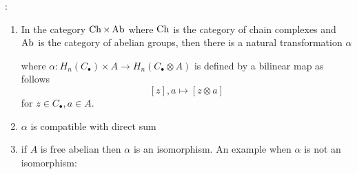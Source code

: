 \documentclass{report}
\begin{document}
\begin{proposition}:
    \begin{enumerate}
        \item In the category $\operatorname{Ch} \times \operatorname{Ab}$ where $\operatorname{Ch}$ is the category of chain complexes and $\operatorname{Ab}$ is the category of abelian groups, then there is a natural transformation $\alpha$
        \begin{center}
        \end{center}
        where $\alpha: H_n(C_\bullet) \times A \to H_n(C_\bullet \otimes A)$ is defined by a bilinear map as follows
        $$
            [z], a \mapsto [z \otimes a]
        $$
        for $z \in C_\bullet, a \in A$.

        \item $\alpha$ is compatible with direct sum
        \begin{center}
        \end{center}

        \item if $A$ is free abelian then $\alpha$ is an isomorphism. An example when $\alpha$ is not an isomorphism:
        \begin{center}
        \end{center}
    \end{enumerate}
\end{proposition}
\end{document}
